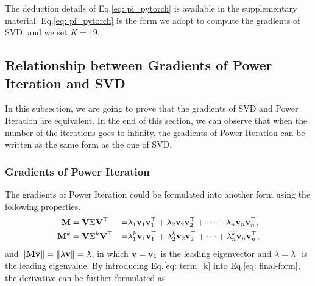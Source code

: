 The deduction details of Eq.\ref{eq: pi_pytorch} is available in the supplementary material.
Eq.\ref{eq: pi_pytorch} is the form we adopt to compute the gradients of SVD, and we set $K{=}19$.


\subsection{Relationship between Gradients of Power Iteration and SVD}
In this subsection, we are going to prove that the gradients of SVD and Power Iteration are equivalent. In the end of this section, we can observe that when the number of the iterations goes to infinity, the gradients of Power Iteration can be written as the same form as the one of SVD.
\subsubsection{Gradients of Power Iteration}
The gradients of Power Iteration could be formulated into another form using the following properties.
	\begin{equation}
	\begin{aligned}
	\mathbf{M} & = \mathbf{V} \Sigma \mathbf{V}^{\top} & = & \lambda_{1}\mathbf{v}_{1}\mathbf{v}_{1}^{\top} + \lambda_{2}\mathbf{v}_{2}\mathbf{v}_{2}^{\top} + \cdots +  \lambda_{n}\mathbf{v}_{n}\mathbf{v}_{n}^{\top}, \\
	\mathbf{M}^{k} & = \mathbf{V} \Sigma^{k} \mathbf{V}^{\top} & = & \lambda_{1}^{k}\mathbf{v}_{1}\mathbf{v}_{1}^{\top} +  \lambda_{2}^{k}\mathbf{v}_{2}\mathbf{v}_{2}^{\top} + \cdots + \lambda_{n}^{k}\mathbf{v}_{n}\mathbf{v}_{n}^{\top},\\
	\end{aligned}
	\label{eq: term_k}
	\end{equation}
	and $\left\|\mathbf{M}\mathbf{v}\right\| = \left\| \lambda \mathbf{v} \right\|= \lambda$,
	in which $\mathbf{v} = \mathbf{v}_1$ is the leading eigenvector and $\lambda=\lambda_1$ is the leading eigenvalue.
	By introducing Eq.\ref{eq: term_k} into Eq.\ref{eq: final-form}, the derivative can be further formulated as
	
